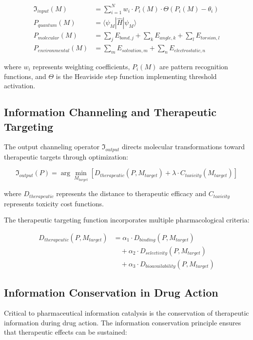 \begin{align}
\mathfrak{I}_{input}(M) &= \sum_{i=1}^{N} w_i \cdot P_i(M) \cdot \Theta(P_i(M) - \theta_i) \\
P_{quantum}(M) &= \langle \psi_M | \hat{H} | \psi_M \rangle \\
P_{molecular}(M) &= \sum_j E_{bond,j} + \sum_k E_{angle,k} + \sum_l E_{torsion,l} \\
P_{environmental}(M) &= \sum_m E_{solvation,m} + \sum_n E_{electrostatic,n}
\end{align}

where $w_i$ represents weighting coefficients, $P_i(M)$ are pattern recognition functions, and $\Theta$ is the Heaviside step function implementing threshold activation.

\subsection{Information Channeling and Therapeutic Targeting}

The output channeling operator $\mathfrak{I}_{output}$ directs molecular transformations toward therapeutic targets through optimization:

\begin{equation}
\mathfrak{I}_{output}(P) = \arg\min_{M_{target}} \left[ D_{therapeutic}(P, M_{target}) + \lambda \cdot C_{toxicity}(M_{target}) \right]
\end{equation}

where $D_{therapeutic}$ represents the distance to therapeutic efficacy and $C_{toxicity}$ represents toxicity cost functions.

The therapeutic targeting function incorporates multiple pharmacological criteria:

\begin{align}
D_{therapeutic}(P, M_{target}) &= \alpha_1 \cdot D_{binding}(P, M_{target}) \\
&\quad + \alpha_2 \cdot D_{selectivity}(P, M_{target}) \\
&\quad + \alpha_3 \cdot D_{bioavailability}(P, M_{target})
\end{align}

\subsection{Information Conservation in Drug Action}

Critical to pharmaceutical information catalysis is the conservation of therapeutic information during drug action. The information conservation principle ensures that therapeutic effects can be sustained:

